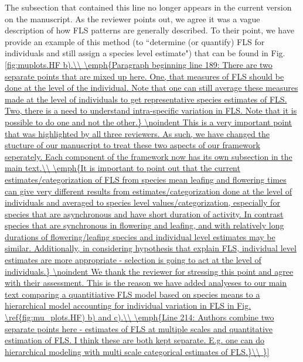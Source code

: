 \documentclass{article}[11pt]
\begin{document}
\noindent The subsection that contained this line no longer appears in the current version on the manuscript. As the reviewer points out, we agree it was a vague description of how FLS patterns are generally described. To their point, we have provide an example of this method (to ``determine (or quantify) FLS for individuals and still assign a species level estimate") that can be found in Fig. \ref{fig:muplots.HF  b).\\


\emph{Paragraph beginning line 189: There are two separate points that are mixed up here. One, that measures of FLS should be done at the level of the individual. Note that one can still average these measures made at the level of individuals to get representative species estimates of FLS. Two, there is a need to understand intra-specific variation in FLS. Note that it is possible to do one and not the other.}
 
\noindent This is a very important point that was highlighted by all three reviewers. As such, we have changed the stucture of our manuscript to treat these two aspects of our framework seperately. Each component of the framework now has its own subsection in the main text.\\

\emph{It is important to point out that the current estimates/categorization of FLS from species mean leafing and flowering times can give very different results from estimates/categorization done at the level of individuals and averaged to species level values/categorization, especially for species that are asynchronous and have short duration of activity. In contrast species that are synchronous in flowering and leafing, and with relatively long durations of flowering/leafing species and individual level estimates may be similar. Additionally, in considering hypothesis that explain FLS, individual level estimates are more appropriate - selection is going to act at the level of individuals.}

\noindent We thank the reviewer for stressing this point and agree with their assessment. This is the reason we have added analyeses to our main text comparing a quantitiative FLS model based on species means to a hierarchical model accounting for individual variation in FLS in Fig.  \ref{fig:mu_plots.HF) b) and c).\\

\emph{Line 214: Authors combine two separate points here - estimates of FLS at multiple scales and quantitative estimation of FLS. I think these are both kept separate. E.g. one can do hierarchical modeling with  multi scale categorical estimates of FLS.}\\

}}
\end{document}
